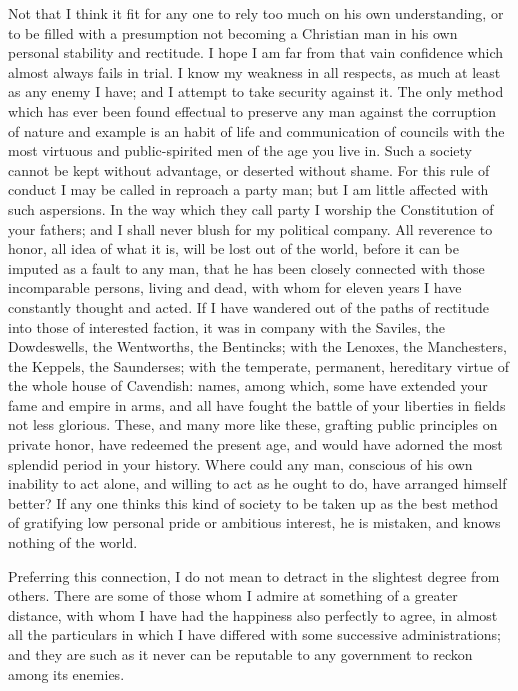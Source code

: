 Not that I think it fit for any one to rely too much on his own understanding, or to be filled with a presumption not becoming a Christian man in his own personal stability and rectitude. I hope I am far from that vain confidence which almost always fails in trial. I know my weakness in all respects, as much at least as any enemy I have; and I attempt to take security against it. The only method which has ever been found effectual to preserve any man against the corruption of nature and example is an habit of life and communication of councils with the most virtuous and public-spirited men of the age you live in. Such a society cannot be kept without advantage, or deserted without shame. For this rule of conduct I may be called in reproach a party man; but I am little affected with such aspersions. In the way which they call party I worship the Constitution of your fathers; and I shall never blush for my political company. All reverence to honor, all idea of what it is, will be lost out of the world, before it can be imputed as a fault to any man, that he has been closely connected with those incomparable persons, living and dead, with whom for eleven years I have constantly thought and acted. If I have wandered out of the paths of rectitude into those of interested faction, it was in company with the Saviles, the Dowdeswells, the Wentworths, the Bentincks; with the Lenoxes, the Manchesters, the Keppels, the Saunderses; with the temperate, permanent, hereditary virtue of the whole house of Cavendish: names, among which, some have extended your fame and empire in arms, and all have fought the battle of your liberties in fields not less glorious. These, and many more like these, grafting public principles on private honor, have redeemed the present age, and would have adorned the most splendid period in your history. Where could any man, conscious of his own inability to act alone, and willing to act as he ought to do, have arranged himself better? If any one thinks this kind of society to be taken up as the best method of gratifying low personal pride or ambitious interest, he is mistaken, and knows nothing of the world.

Preferring this connection, I do not mean to detract in the slightest degree from others. There are some of those whom I admire at something of a greater distance, with whom I have had the happiness also perfectly to agree, in almost all the particulars in which I have differed with some successive administrations; and they are such as it never can be reputable to any government to reckon among its enemies.

